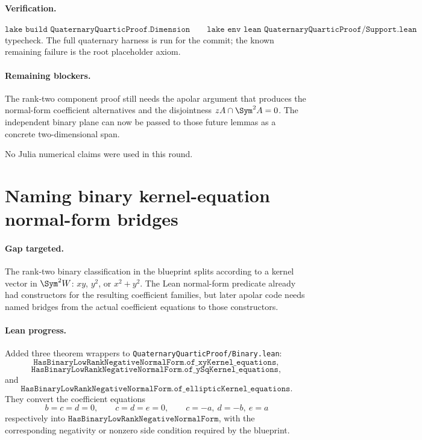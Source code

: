 \documentclass[11pt]{article}
\begin{document}
\paragraph{Verification.}
\[
\texttt{lake build QuaternaryQuarticProof.Dimension}
\qquad
\texttt{lake env lean QuaternaryQuarticProof/Support.lean}
\]
typecheck.  The full quaternary harness is run for the commit; the known
remaining failure is the root placeholder axiom.

\paragraph{Remaining blockers.}
The rank-two component proof still needs the apolar argument that produces the
normal-form coefficient alternatives and the disjointness
\(zA\cap\Sym^2A=0\).  The independent binary plane can now be passed to those
future lemmas as a concrete two-dimensional span.

No Julia numerical claims were used in this round.

\section*{Naming binary kernel-equation normal-form bridges}

\paragraph{Gap targeted.}
The rank-two binary classification in the blueprint splits according to a
kernel vector in \(\Sym^2W\): \(xy\), \(y^2\), or \(x^2+y^2\).  The Lean
normal-form predicate already had constructors for the resulting coefficient
families, but later apolar code needs named bridges from the actual coefficient
equations to those constructors.

\paragraph{Lean progress.}
Added three theorem wrappers to \texttt{QuaternaryQuarticProof/Binary.lean}:
\[
\texttt{HasBinaryLowRankNegativeNormalForm.of\_xyKernel\_equations},
\]
\[
\texttt{HasBinaryLowRankNegativeNormalForm.of\_ySqKernel\_equations},
\]
and
\[
\texttt{HasBinaryLowRankNegativeNormalForm.of\_ellipticKernel\_equations}.
\]
They convert the coefficient equations
\[
b=c=d=0,\qquad c=d=e=0,\qquad c=-a,\ d=-b,\ e=a
\]
respectively into
\(\texttt{HasBinaryLowRankNegativeNormalForm}\), with the corresponding
negativity or nonzero side condition required by the blueprint.
\end{document}
